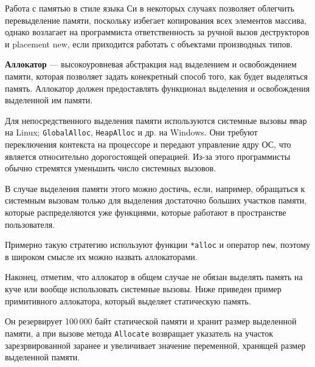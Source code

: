 Работа с памятью в стиле языка Си в некоторых случаях позволяет облегчить
перевыделение памяти, поскольку избегает копирования всех элементов массива,
однако возлагает на программиста ответственность за ручной вызов деструкторов
и placement new, если приходится работать с объектами производных типов.

\textbf{Аллокатор} --- высокоуровневая абстракция над выделением и освобождением памяти,
которая позволяет задать конекретный способ того, как будет выделяться память. Аллокатор
должен предоставлять функционал выделения и освобождения выделенной им памяти.

Для непосредственного выделения памяти используются системные вызовы
\verb|mmap| на Linux; \verb|GlobalAlloc|, \verb|HeapAlloc| и др. на Windows.
Они требуют переключения контекста на процессоре и передают управление ядру ОС,
что является относительно дорогостоящей операцией. Из-за этого программисты обычно
стремятся уменьшить число системных вызовов.

В случае выделения памяти этого можно достичь, если, например, обращаться к системным вызовам
только для выделения достаточно больших участков памяти, которые распределяются уже функциями,
которые работают в пространстве пользователя.

Примерно такую стратегию используют функции \verb|*alloc| и оператор \verb|new|, поэтому
в широком смысле их можно назвать аллокаторами.

Наконец, отметим, что аллокатор в общем случае не обязан выделять память на куче или вообще использовать
системные вызовы. Ниже приведен пример примитивного аллокатора, который выделяет статическую память.

Он резервирует 100\,000 байт статической памяти и хранит размер
выделенной памяти, а при вызове метода \verb|Allocate| возвращает указатель на участок
зарезрвированной заранее и увеличивает значение переменной, хранящей
размер выделенной памяти.

